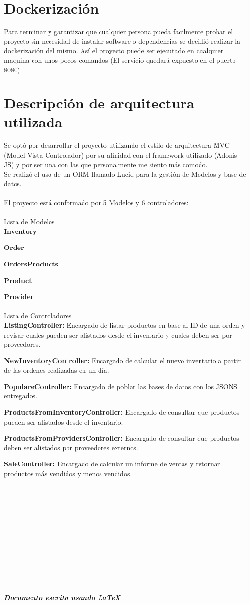 \documentclass{article}
\begin{document}
\section{Dockerización}
Para terminar y garantizar que cualquier persona pueda facilmente probar el proyecto sin necesidad de instalar software o dependencias se decidió realizar la dockerización del mismo. Así el proyecto puede ser ejecutado en cualquier maquina con unos pocos comandos (El servicio quedará expuesto en el puerto 8080)

\section{Descripción de arquitectura utilizada}

Se optó por desarrollar el proyecto utilizando el estilo de arquitectura MVC (Model Vista Controlador) por su afinidad con el framework utilizado (Adonis JS) y por ser una con las que personalmente me siento más comodo.
\\
Se realizó el uso de un ORM llamado Lucid para la gestión de Modelos y base de datos.
\\\\
El proyecto está conformado por 5 Modelos y 6 controladores:\\
\\
Lista de Modelos\\

\textbf{Inventory}

\textbf{Order}

\textbf{OrdersProducts}

\textbf{Product}

\textbf{Provider}
\\\\
Lista de Controladores\\

\textbf{ListingController:} Encargado de listar productos en base al ID de una orden y revisar cuales pueden ser alistados desde el inventario y cuales deben ser por proveedores.

\textbf{NewInventoryController:} Encargado de calcular el nuevo inventario a partir de las ordenes realizadas en un día.

\textbf{PopulareController:} Encargado de poblar las bases de datos con los JSONS entregados.

\textbf{ProductsFromInventoryController:} Encargado de consultar que productos pueden ser alistados desde el inventario.

\textbf{ProductsFromProvidersController:} Encargado de consultar que productos deben ser alistados por proveedores externos.

\textbf{SaleController:} Encargado de calcular un informe de ventas y retornar productos más vendidos y menos vendidos.
\\\\\\\\\\\\\\\\\\\\\\\\\\
\textit{\textbf{Documento escrito usando LaTeX}}
\end{document}
